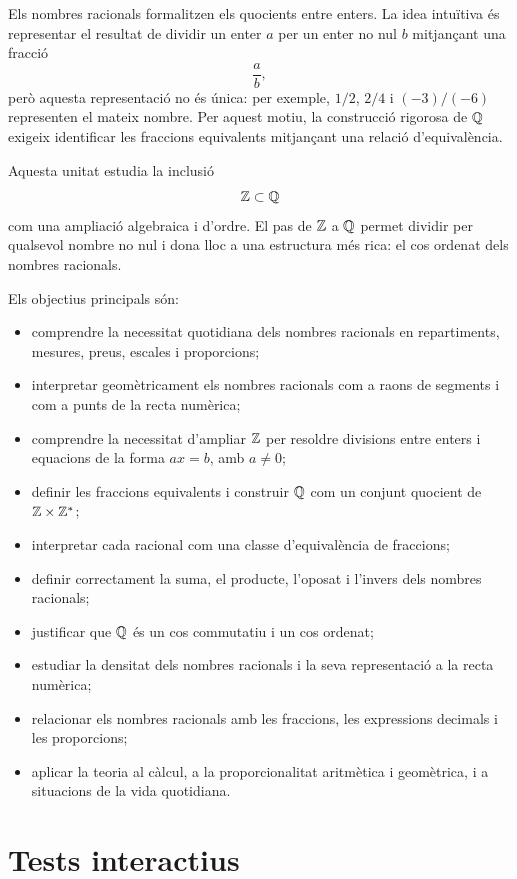 \documentclass[12pt,a4paper,oneside]{book}
\begin{document}
	Els nombres racionals formalitzen els quocients entre enters. La idea intuïtiva és representar el resultat de dividir un enter \(a\) per un enter no nul \(b\) mitjançant una fracció
	\[
	\frac{a}{b},
	\]
	però aquesta representació no és única: per exemple, \(1/2\), \(2/4\) i \((-3)/(-6)\) representen el mateix nombre. Per aquest motiu, la construcció rigorosa de \(\mathbb{Q}\) exigeix identificar les fraccions equivalents mitjançant una relació d'equivalència.
	
	Aquesta unitat estudia la inclusió
	\[
	\mathbb{Z}\subset \mathbb{Q}
	\]
	com una ampliació algebraica i d'ordre. El pas de \(\mathbb{Z}\) a \(\mathbb{Q}\) permet dividir per qualsevol nombre no nul i dona lloc a una estructura més rica: el cos ordenat dels nombres racionals.
	
	Els objectius principals són:
	\begin{itemize}
		\item comprendre la necessitat quotidiana dels nombres racionals en repartiments, mesures, preus, escales i proporcions;
		\item interpretar geomètricament els nombres racionals com a raons de segments i com a punts de la recta numèrica;
		\item comprendre la necessitat d'ampliar \(\mathbb{Z}\) per resoldre divisions entre enters i equacions de la forma \(ax=b\), amb \(a\neq0\);
		\item definir les fraccions equivalents i construir \(\mathbb{Q}\) com un conjunt quocient de \(\mathbb{Z}\times\mathbb{Z}^{*}\);
		\item interpretar cada racional com una classe d'equivalència de fraccions;
		\item definir correctament la suma, el producte, l'oposat i l'invers dels nombres racionals;
		\item justificar que \(\mathbb{Q}\) és un cos commutatiu i un cos ordenat;
		\item estudiar la densitat dels nombres racionals i la seva representació a la recta numèrica;
		\item relacionar els nombres racionals amb les fraccions, les expressions decimals i les proporcions;
		\item aplicar la teoria al càlcul, a la proporcionalitat aritmètica i geomètrica, i a situacions de la vida quotidiana.
	\end{itemize}
	
	\let\cleardoublepage\clearpage
	
	\mainmatter
	
	
	
	
	
	\chapter{Tests interactius}
	\label{cap:tests}
	
	\begin{Form}
	\end{Form}
	
	\backmatter
	
\end{document}
